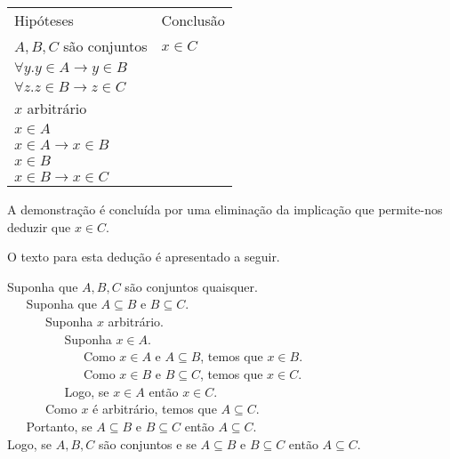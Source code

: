 \begin{Example}
\begin{flushleft}
\begin{tabular}{ll}
        Hipóteses & Conclusão \\
        $A,B,C$ são conjuntos & $x \in C$\\
        $\forall y. y\in A \to y \in B$ & \\
       $\forall z. z \in B \to z \in C$ & \\
       $x$ arbitrário & \\
       $x\in A$ & \\
       $x\in A \to x\in B$ & \\
       $x\in B$ & \\
       $x\in B \to x \in C$ & \\
  \end{tabular}
\end{flushleft}
A demonstração é concluída por uma eliminação da implicação que
permite-nos deduzir que $x\in C$.

O texto para esta dedução é apresentado a seguir.
\begin{flushleft}
Suponha que $A,B,C$ são conjuntos quaisquer.\\
\verb|   |Suponha que $A\subseteq B$ e $B\subseteq C$.\\
\verb|      |Suponha $x$ arbitrário.\\
\verb|         |Suponha $x\in A$.\\
\verb|            |Como $x\in A$ e $A\subseteq B$, temos que $x\in B$.\\
\verb|            |Como $x\in B$ e $B\subseteq C$, temos que $x\in C$.\\
\verb|         |Logo, se $x\in A$ então $x\in C$.\\
\verb|      |Como $x$ é arbitrário, temos que $A\subseteq C$.\\
\verb|   |Portanto, se $A\subseteq B$ e $B\subseteq C$ então
$A\subseteq C$.\\
Logo, se $A,B,C$ são conjuntos e se $A\subseteq B$ e $B\subseteq C$
então $A\subseteq C$.
\end{flushleft}
\end{Example}
